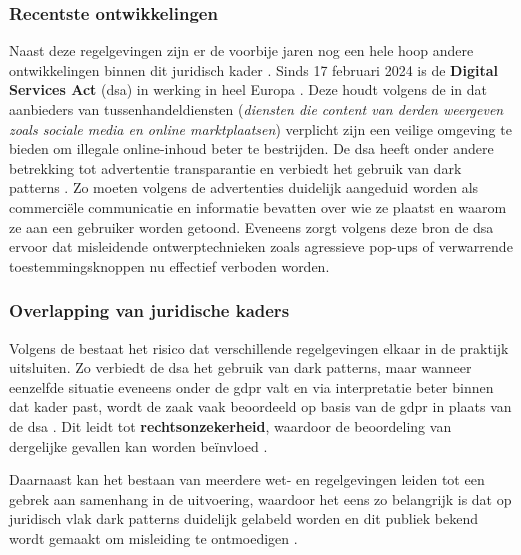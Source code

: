 \vspace{1em}

\subsubsection{Recentste ontwikkelingen}
Naast deze regelgevingen zijn er de voorbije jaren nog een hele hoop andere ontwikkelingen binnen dit juridisch kader \autocite{Commissie2022}. Sinds 17 februari 2024 is de \textbf{Digital Services Act} (\acrshort{dsa}) in werking in heel Europa \autocite{FODEconomie2024a}. Deze houdt volgens de \textcite{FODEconomie2024a} in dat aanbieders van tussenhandeldiensten (\textit{diensten die content van derden weergeven zoals sociale media en online marktplaatsen}) verplicht zijn een veilige omgeving te bieden om illegale online-inhoud beter te bestrijden.
De \acrshort{dsa} heeft onder andere betrekking tot advertentie transparantie en verbiedt het gebruik van dark patterns \autocite{EuropeseCommissie2024}. Zo moeten volgens de \textcite{EuropeseCommissie2024} advertenties duidelijk aangeduid worden als commerciële communicatie en informatie bevatten over wie ze plaatst en waarom ze aan een gebruiker worden getoond. Eveneens zorgt volgens deze bron de \acrshort{dsa} ervoor dat misleidende ontwerptechnieken zoals agressieve pop-ups of verwarrende toestemmingsknoppen nu effectief verboden worden. 

\vspace{1em}

\subsubsection{Overlapping van juridische kaders}

Volgens de \textcite{EPRS2025} bestaat het risico dat verschillende regelgevingen elkaar in de praktijk uitsluiten. Zo verbiedt de \acrshort{dsa} het gebruik van dark patterns, maar wanneer eenzelfde situatie eveneens onder de \acrshort{gdpr} valt en via interpretatie beter binnen dat kader past, wordt de zaak vaak beoordeeld op basis van de \acrshort{gdpr} in plaats van de \acrshort{dsa} \autocite{EPRS2025}. Dit leidt tot \textbf{rechtsonzekerheid}, waardoor de beoordeling van dergelijke gevallen kan worden beïnvloed \autocite{EPRS2025}.

\vspace{0.5em}

Daarnaast kan het bestaan van meerdere wet- en regelgevingen leiden tot een gebrek aan samenhang in de uitvoering, waardoor het eens zo belangrijk is dat op juridisch vlak dark patterns duidelijk gelabeld worden en dit publiek bekend wordt gemaakt om misleiding te ontmoedigen \autocite{EPRS2025}.

